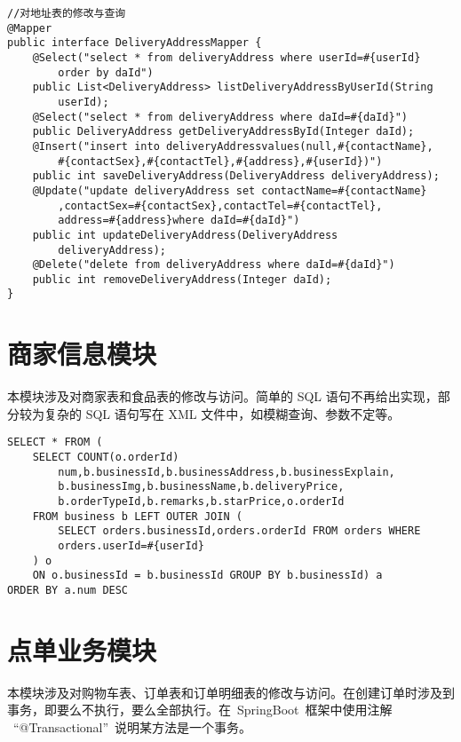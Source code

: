 \begin{lstlisting}[basicstyle=\footnotesize]
//对地址表的修改与查询
@Mapper
public interface DeliveryAddressMapper {
    @Select("select * from deliveryAddress where userId=#{userId} 
        order by daId")
    public List<DeliveryAddress> listDeliveryAddressByUserId(String
        userId);
    @Select("select * from deliveryAddress where daId=#{daId}")
    public DeliveryAddress getDeliveryAddressById(Integer daId);
    @Insert("insert into deliveryAddressvalues(null,#{contactName},
        #{contactSex},#{contactTel},#{address},#{userId})")
    public int saveDeliveryAddress(DeliveryAddress deliveryAddress);
    @Update("update deliveryAddress set contactName=#{contactName}
        ,contactSex=#{contactSex},contactTel=#{contactTel},
        address=#{address}where daId=#{daId}")
    public int updateDeliveryAddress(DeliveryAddress 
        deliveryAddress);
    @Delete("delete from deliveryAddress where daId=#{daId}")
    public int removeDeliveryAddress(Integer daId);
}
\end{lstlisting}

\section{商家信息模块}
本模块涉及对商家表和食品表的修改与访问。简单的 SQL 语句不再给出实现，部分较为复杂的 SQL 语句写在 XML 文件中，如模糊查询、参数不定等。

\begin{lstlisting}[basicstyle=\footnotesize]
SELECT * FROM (
    SELECT COUNT(o.orderId)
        num,b.businessId,b.businessAddress,b.businessExplain,
        b.businessImg,b.businessName,b.deliveryPrice,
        b.orderTypeId,b.remarks,b.starPrice,o.orderId
    FROM business b LEFT OUTER JOIN (
        SELECT orders.businessId,orders.orderId FROM orders WHERE
        orders.userId=#{userId}
    ) o
    ON o.businessId = b.businessId GROUP BY b.businessId) a
ORDER BY a.num DESC
\end{lstlisting}

\section{点单业务模块}
本模块涉及对购物车表、订单表和订单明细表的修改与访问。在创建订单时涉及到事务，即要么不执行，要么全部执行。在~SpringBoot~框架中使用注解
~“@Transactional”~说明某方法是一个事务。

